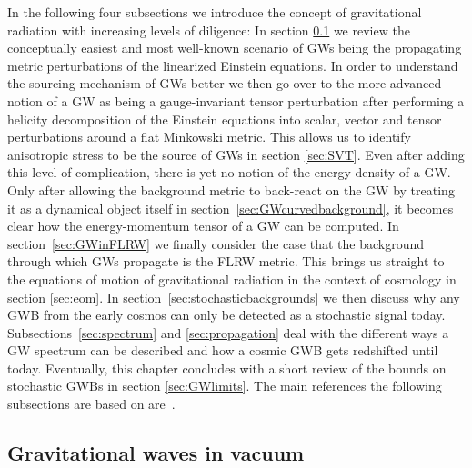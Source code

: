 In the following four subsections we introduce the concept of gravitational radiation with increasing levels of diligence: In section \ref{sec:GWinvac} we review the conceptually easiest and  most well-known scenario of \acp{GW} being the propagating metric perturbations of the linearized Einstein equations. In order to understand the sourcing mechanism of \acp{GW} better we then go over to the more advanced notion of a \ac{GW} as being a gauge-invariant tensor perturbation after performing a helicity decomposition of the Einstein equations into scalar, vector and tensor perturbations around a flat Minkowski metric. This allows us to identify anisotropic stress to be the source of \acp{GW} in section \ref{sec:SVT}. Even after adding this level of complication, there is yet no notion of the energy density of a \ac{GW}. Only after allowing the background metric to back-react on the \ac{GW} by treating it as a dynamical object itself in section~\ref{sec:GWcurvedbackground}, it becomes clear how the energy-momentum tensor of a \ac{GW} can be computed. In section~\ref{sec:GWinFLRW} we finally consider the case that the background through which \acp{GW} propagate is the \ac{FLRW} metric. This brings us straight to the equations of motion of gravitational radiation in the context of cosmology in section \ref{sec:eom}. In section~\ref{sec:stochasticbackgrounds} we then discuss why any \ac{GWB} from the early cosmos can only be detected as a stochastic signal today. Subsections~\ref{sec:spectrum} and \ref{sec:propagation} deal with the different ways a \ac{GW} spectrum can be described and how a cosmic \ac{GWB} gets redshifted until today. Eventually, this chapter concludes with a short review of the bounds on stochastic \acp{GWB} in section \ref{sec:GWlimits}. The main references the following subsections are based on are~\cite{Maggiore:2007ulw, Maggiore:2018sht, Caprini:2018mtu}.

\subsection{Gravitational waves in vacuum} \label{sec:GWinvac}

